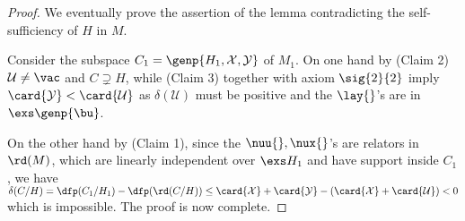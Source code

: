\begin{proof}
\medskip
We eventually prove the assertion of the lemma contradicting the self-sufficiency of $H$ in $M$.

Consider the subspace $C_{1}=\genp{H_1,\mathcal{X},\mathcal{Y}}$ of $M_{1}$.
On one hand by (Claim 2) $\mathcal{U}\neq\vac$ and $C\supsetneq H$, while (Claim 3) together with axiom $\sig{2}{2}$ imply $\card{\mathcal{Y}}<\card{\mathcal{U}}$ as
$\delta(\mathcal{U})$ must be positive and the $\lay{}$'s are in $\exs\genp{\bu}$.

On the other hand by (Claim 1), since the $\nuu{},\nux{}$'s are relators in $\rd(M)$, which are linearly independent over $\exs H_{1}$
and have support inside $C_{1}$, we have $\delta(C/H)=\dfp(C_{1}/H_{1})-\dfp(\rd(C/H))\leq\card{\mathcal{X}}+\card{\mathcal{Y}}-
(\card{\mathcal{X}}+\card{\mathcal{U}})<0$ which is impossible.
The proof is now complete.
\end{proof}